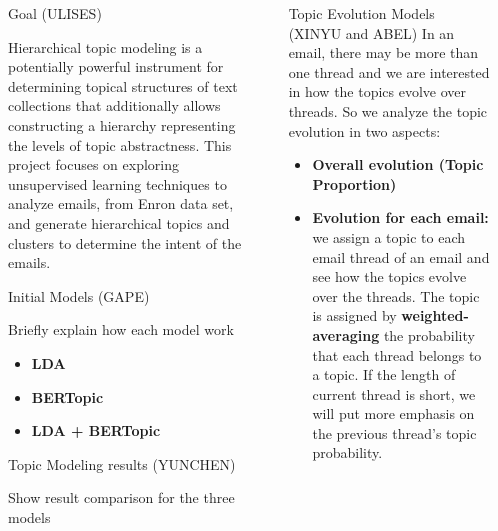 \documentclass[final]{beamer}
\newlength{\sepwidth}
\newlength{\colwidth}
\newcommand{\separatorcolumn}{\begin{column}{\sepwidth}\end{column}}
\begin{document}
\begin{frame}[t]
\begin{columns}[t]
\separatorcolumn

\begin{column}{\colwidth}

  \begin{block}{Goal (ULISES)}

    Hierarchical topic modeling is a potentially powerful instrument for determining topical structures of text collections that additionally allows constructing a hierarchy representing the levels of topic abstractness. This project focuses on exploring unsupervised learning techniques to analyze emails, from Enron data set, and generate hierarchical topics and clusters to determine the intent of the emails. 



  \end{block}

  \begin{block}{Initial Models (GAPE)}

    Briefly explain how each model work
    \begin{itemize}
      \item \textbf{LDA}
      \item \textbf{BERTopic}
      \item \textbf{LDA + BERTopic}
    \end{itemize}


  \end{block}

  \begin{block}{Topic Modeling results (YUNCHEN) }

    Show result comparison for the three models


  \end{block}

\end{column}

\separatorcolumn

\begin{column}{\colwidth}

  \begin{block}{Topic Evolution Models (XINYU and ABEL)}
    In an email, there may be more than one thread and we are interested in how the topics evolve over threads. So we analyze the topic evolution in two aspects:
    \begin{itemize}
      \item \textbf{Overall evolution (Topic Proportion)}
      \item \textbf{Evolution for each email:} we assign a topic to each email thread of an email and see how the topics evolve over the threads. The topic is assigned by \textbf{weighted-averaging} the probability that each thread belongs to a topic. If the length of current thread is short, we will put more emphasis on the previous thread's topic probability. 
    \end{itemize}


\end{block}
\end{column}
\end{columns}
\end{frame}
\end{document}
